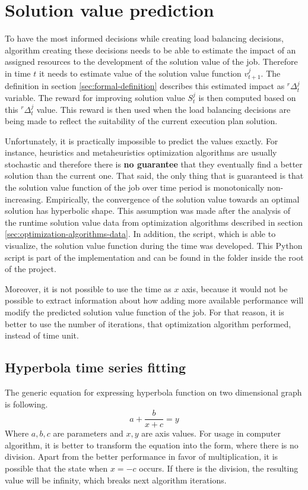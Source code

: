 \section{Solution value prediction}\label{sec:algorithm-value-prediction}

To have the most informed decisions while creating load balancing decisions,
algorithm creating these decisions needs to be able to estimate the impact of an assigned resources to the development of the solution value of the job.
Therefore in time $t$ it needs to estimate value of the solution value function $v_{t+1}^{j}$.
The definition in section \ref{sec:formal-definition} describes this estimated impact as $^{r}\Delta_{t}^{j}$ variable.
The reward for improving solution value $S_{t}^{j}$ is then computed based on this $^{r}\Delta_{t}^{j}$ value.
This reward is then used when the load balancing decisions are being made to reflect the suitability of the current execution plan solution.

Unfortunately, 
it is practically impossible to predict the values exactly.
For instance, heuristics and metaheuristics optimization algorithms are usually stochastic 
and therefore there is \textbf{no guarantee} that they eventually find a better solution than the current one.
That said, 
the only thing that is guaranteed is that the solution value function of the job over time period is monotonically non-increasing.
Empirically,
the convergence of the solution value towards an optimal solution has hyperbolic shape.
This assumption was made after the analysis of the runtime solution value data from optimization algorithms described in section \ref{sec:optimization-algorithms-data}.
In addition, 
the script, which is able to visualize, the solution value function during the time was developed.
This Python script is part of the implementation and can be found in the  folder inside the root of the project.

Moreover, 
it is not possible to use the time as $x$ axis,
because it would not be possible to extract information about 
how adding more available performance will modify the predicted solution value function of the job.
For that reason,
it is better to use the number of iterations, that optimization algorithm performed,
instead of time unit.

\subsection{Hyperbola time series fitting}
The generic equation for expressing hyperbola function on two dimensional graph is following.
\begin{equation}
    a + \dfrac{b}{x+c} = y
\end{equation}
Where $a,b,c$ are parameters and $x,y$ are axis values.
For usage in computer algorithm,
it is better to transform the equation into the form, 
where there is no division.
Apart from the better performance in favor of multiplication\cite{LeFevre1999},
it is possible that the state when $x = -c$ occurs.
If there is the division,
the resulting value will be infinity,
which breaks next algorithm iterations.

